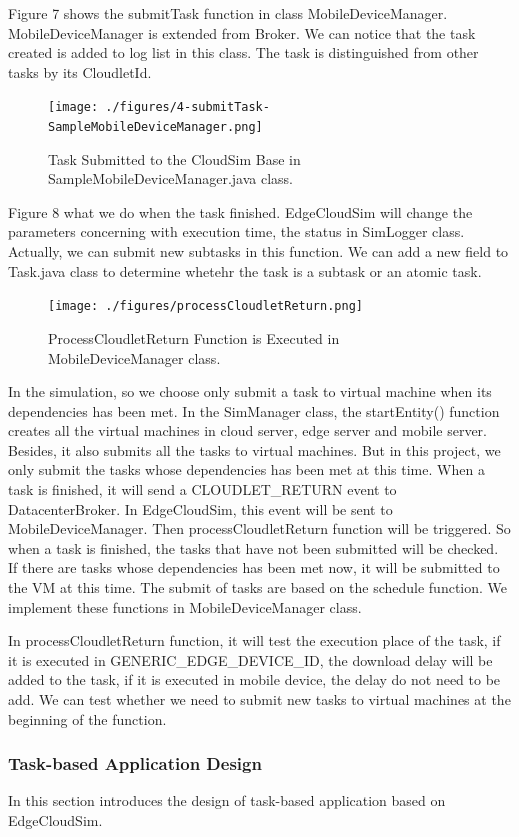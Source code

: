 Figure 7 shows the submitTask function in class MobileDeviceManager. MobileDeviceManager is extended from Broker. We can notice that the task created is added to log list in this class. The task is distinguished from other tasks by its CloudletId. 
\begin{figure}
	\centering
	\texttt{[image: ./figures/4-submitTask-SampleMobileDeviceManager.png]}
	\caption{\label{fig:frog}Task Submitted to the CloudSim Base in SampleMobileDeviceManager.java class.}
\end{figure}

Figure 8 what we do when the task finished. EdgeCloudSim will change the parameters concerning with execution time, the status in SimLogger class. Actually, we can submit new subtasks in this function. We can add a new field to Task.java class to determine whetehr the task is a subtask or an atomic task.
\begin{figure}
	\centering
	\texttt{[image: ./figures/processCloudletReturn.png]}
	\caption{\label{fig:frog}ProcessCloudletReturn Function is Executed in MobileDeviceManager class.}
\end{figure}

 In the simulation, so we choose only submit a task to virtual machine when its dependencies has been met. In the SimManager class, the startEntity() function creates all the virtual machines in cloud server, edge server and mobile server. Besides, it also submits all the tasks to virtual machines. But in this project, we only submit the tasks whose dependencies has been met at this time. When a task is finished, it will send a CLOUDLET\_RETURN event to DatacenterBroker. In EdgeCloudSim, this event will be sent to MobileDeviceManager. Then processCloudletReturn function will be triggered. So when a task is finished, the tasks that have not been submitted will be checked. If there are tasks whose dependencies has been met now, it will be submitted to the VM at this time. The submit of tasks are based on the schedule function. We implement these functions in MobileDeviceManager class.

In processCloudletReturn function, it will test the execution place of the task, if it is executed in GENERIC\_EDGE\_DEVICE\_ID, the download delay will be added to the task, if it is executed in mobile device, the delay do not need to be add. We can test whether we need to submit new tasks to virtual machines at the  beginning of the function. 

\subsubsection{Task-based Application Design}
In this section introduces the design of task-based application based on EdgeCloudSim.

